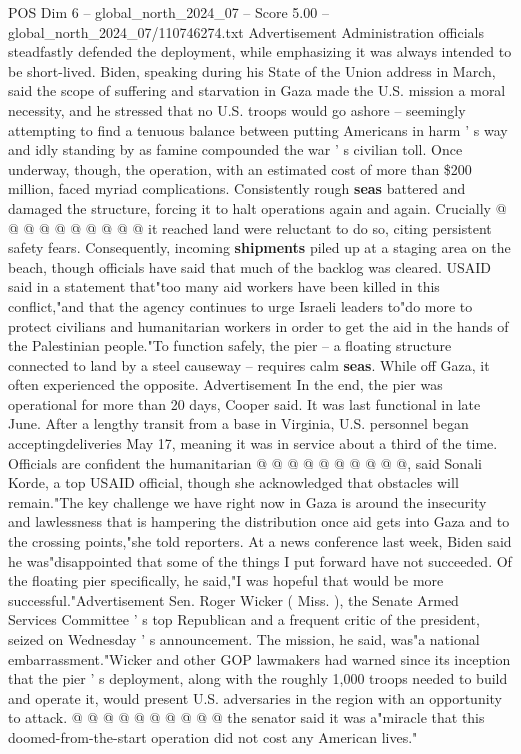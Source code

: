 \begin{textsample}{POS Dim 6 – global\_north\_2024\_07 – Score 5.00 – global\_north\_2024\_07/110746274.txt}
Advertisement Administration officials steadfastly defended the deployment, while emphasizing it was always intended to be short-lived.
Biden, speaking during his State of the Union address in March, said the scope of suffering and starvation in Gaza made the U.S. mission a moral necessity, and he stressed that no U.S. troops would go ashore -- seemingly attempting to find a tenuous balance between putting Americans in harm ' s way and idly standing by as famine compounded the war ' s civilian toll.
Once underway, though, the operation, with an estimated cost of more than \$200 million, faced myriad complications.
Consistently rough \textbf{seas} battered and damaged the structure, forcing it to halt operations again and again.
Crucially @ @ @ @ @ @ @ @ @ @ it reached land were reluctant to do so, citing persistent safety fears.
Consequently, incoming \textbf{shipments} piled up at a staging area on the beach, though officials have said that much of the backlog was cleared.
USAID said in a statement that"too many aid workers have been killed in this conflict,"and that the agency continues to urge Israeli leaders to"do more to protect civilians and humanitarian workers in order to get the aid in the hands of the Palestinian people."To function safely, the pier -- a floating structure connected to land by a steel causeway -- requires calm \textbf{seas}.
While off Gaza, it often experienced the opposite.
Advertisement In the end, the pier was operational for more than 20 days, Cooper said.
It was last functional in late June.
After a lengthy transit from a base in Virginia, U.S. personnel began acceptingdeliveries May 17, meaning it was in service about a third of the time.
Officials are confident the humanitarian @ @ @ @ @ @ @ @ @ @, said Sonali Korde, a top USAID official, though she acknowledged that obstacles will remain."The key challenge we have right now in Gaza is around the insecurity and lawlessness that is hampering the distribution once aid gets into Gaza and to the crossing points,"she told reporters.
At a news conference last week, Biden said he was"disappointed that some of the things I put forward have not succeeded.
Of the floating pier specifically, he said,"I was hopeful that would be more successful."Advertisement Sen.
Roger Wicker ( Miss. ), the Senate Armed Services Committee ' s top Republican and a frequent critic of the president, seized on Wednesday ' s announcement.
The mission, he said, was"a national embarrassment."Wicker and other GOP lawmakers had warned since its inception that the pier ' s deployment, along with the roughly 1,000 troops needed to build and operate it, would present U.S. adversaries in the region with an opportunity to attack. @ @ @ @ @ @ @ @ @ @ the senator said it was a"miracle that this doomed-from-the-start operation did not cost any American lives."

\end{textsample}
